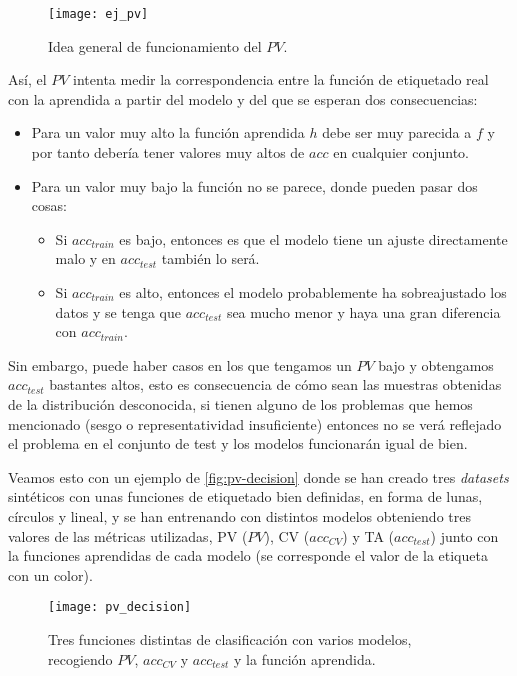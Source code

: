 \begin{figure}[htpb]
  \centering
  \texttt{[image: ej\_pv]}
  \caption{Idea general de funcionamiento del $PV$.}
  \label{fig:ej-pv}
\end{figure}

Así, el $PV$ intenta medir la correspondencia entre la función de etiquetado real con la aprendida a partir del modelo y del que se esperan dos consecuencias:

\begin{itemize}
  \item Para un valor muy alto la función aprendida $h$ debe ser muy parecida a $f$ y por tanto debería tener valores muy altos de $acc$ en cualquier conjunto.
  \item Para un valor muy bajo la función no se parece, donde pueden pasar dos cosas:
    \begin{itemize}
      \item Si $acc_{train}$ es bajo, entonces es que el modelo tiene un ajuste directamente malo y en $acc_{test}$ también lo será.
      \item Si $acc_{train}$ es alto, entonces el modelo probablemente ha sobreajustado los datos y se tenga que $acc_{test}$ sea mucho menor y haya una gran diferencia con $acc_{train}$.
    \end{itemize}
\end{itemize}

Sin embargo, puede haber casos en los que tengamos un $PV$ bajo y obtengamos $acc_{test}$ bastantes altos, esto es consecuencia de cómo sean las muestras obtenidas de la distribución desconocida, si tienen alguno de los problemas que hemos mencionado (sesgo o representatividad insuficiente) entonces no se verá reflejado el problema en el conjunto de test y los modelos funcionarán igual de bien.

Veamos esto con un ejemplo de \cite{zhang2019perturbation} \autoref{fig:pv-decision} donde se han creado tres \emph{datasets} sintéticos con unas funciones de etiquetado bien definidas, en forma de lunas, círculos y lineal, y se han entrenando con distintos modelos obteniendo tres valores de las métricas utilizadas, PV ($PV$), CV ($acc_{CV}$) y TA ($acc_{test}$) junto con la funciones aprendidas de cada modelo (se corresponde el valor de la etiqueta con un color).

\begin{figure}[htpb]
  \centering
  \hspace*{-1.cm}
  \texttt{[image: pv\_decision]}
  \caption{Tres funciones distintas de clasificación con varios modelos, recogiendo $PV$, $acc_{CV}$ y $acc_{test}$ y la función aprendida.}
  \label{fig:pv-decision}
\end{figure}

